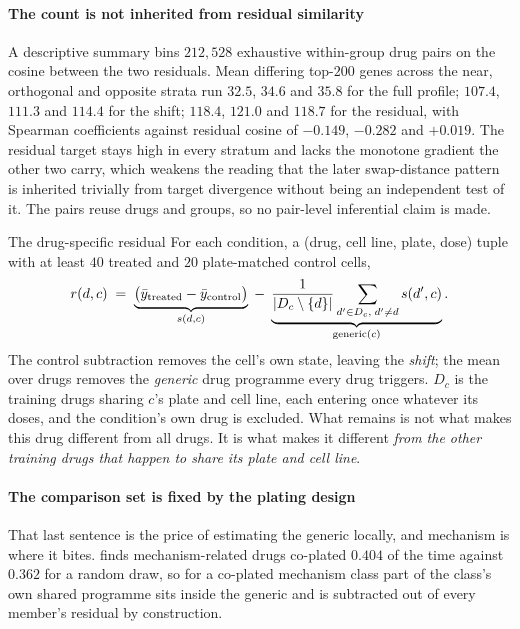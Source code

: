 \paragraph{The count is not inherited from residual similarity} A descriptive
summary bins $212{,}528$ exhaustive within-group drug pairs on the cosine between
the two residuals. Mean differing top-$200$ genes across the near,
orthogonal and opposite strata run $32.5$, $34.6$ and $35.8$ for the full
profile; $107.4$, $111.3$ and $114.4$ for the shift; $118.4$, $121.0$ and
$118.7$ for the residual, with Spearman coefficients against residual cosine of
$-0.149$, $-0.282$ and $+0.019$. The residual target stays high in every stratum
and lacks the monotone gradient the other two carry, which weakens the reading
that the later swap-distance pattern is inherited trivially from target
divergence without being an independent test of it. The pairs reuse drugs and
groups, so no pair-level inferential claim is made.

\begin{defn}{The drug-specific residual}
For each condition, a (drug, cell line, plate, dose) tuple with at least $40$
treated and $20$ plate-matched control cells,
\begin{equation}
 r(d,c) \;=\; \underbrace{\big(\bar{y}_{\textrm{treated}} - \bar{y}_{\textrm{control}}\big)}_{s(d,c)}
 \;-\; \underbrace{\frac{1}{|D_c \setminus \{d\}|}\sum_{d' \in D_c,\; d' \neq d} s(d',c)}_{\textrm{generic}(c)} .
\end{equation}
The control subtraction removes the cell's own state, leaving the \emph{shift};
the mean over drugs removes the \emph{generic} drug programme every drug
triggers. $D_c$ is the training drugs sharing $c$'s plate and cell line, each
entering once whatever its doses, and the condition's own drug is excluded.
What remains is not what makes this drug different from all drugs. It
is what makes it different \emph{from the other training drugs that happen to
share its plate and cell line}.
\end{defn}

\paragraph{The comparison set is fixed by the plating design} That last sentence
is the price of estimating the generic locally, and mechanism is where it bites.
 finds mechanism-related drugs co-plated $0.404$ of the time
against $0.362$ for a random draw, so for a co-plated mechanism class part of the
class's own shared programme sits inside the generic and is subtracted out of
every member's residual by construction.

